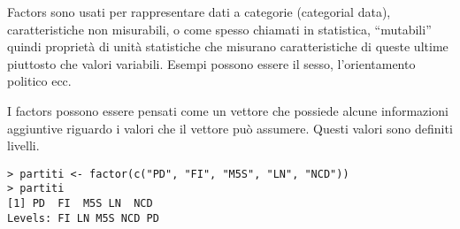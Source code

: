 Factors sono usati per rappresentare dati a categorie (categorial data), caratteristiche non misurabili, o come spesso chiamati in statistica, ``mutabili'' quindi proprietà di unità statistiche che misurano caratteristiche di queste ultime piuttosto che valori variabili. Esempi possono essere il sesso, l'orientamento politico ecc.

I factors possono essere pensati come un vettore che possiede alcune informazioni aggiuntive riguardo i valori che il vettore può assumere. Questi valori sono definiti livelli.

\begin{lstlisting}
> partiti <- factor(c("PD", "FI", "M5S", "LN", "NCD"))
> partiti
[1] PD  FI  M5S LN  NCD
Levels: FI LN M5S NCD PD
\end{lstlisting}
